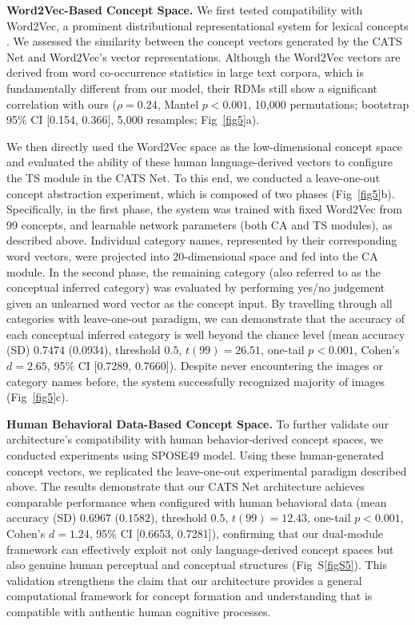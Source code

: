 \documentclass[pdflatex,sn-mathphys-num,lineno]{sn-jnl}%
\begin{document}
\begin{CJK}{UTF8}{gbsn}
\textbf{Word2Vec-Based Concept Space.} We first tested compatibility with Word2Vec, a prominent distributional representational system for lexical concepts \cite{mikolov_distributed_2013,mikolov_advances_2018}. We assessed the similarity between the concept vectors generated by the CATS Net and Word2Vec's vector representations. Although the Word2Vec vectors are derived from word co-occurrence statistics in large text corpora, which is fundamentally different from our model, their RDMs still show a significant correlation with ours ($\rho=0.24$, Mantel $p < 0.001$, 10,000 permutations; bootstrap 95\% CI [0.154, 0.366], 5,000 resamples; Fig~\ref{fig5}a). 

We then directly used the Word2Vec space as the low-dimensional concept space and evaluated the ability of these human language-derived vectors to configure the TS module in the CATS Net. To this end, we conducted a leave-one-out concept abstraction experiment, which is composed of two phases (Fig~\ref{fig5}b). Specifically, in the first phase, the system was trained with fixed Word2Vec from 99 concepts, and learnable network parameters (both CA and TS modules), as described above. Individual category names, represented by their corresponding word vectors, were projected into 20-dimensional space and fed into the CA module. In the second phase, the remaining category (also referred to as the conceptual inferred category) was evaluated by performing yes/no judgement given an unlearned word vector as the concept input. By travelling through all categories with leave-one-out paradigm, we can demonstrate that the accuracy of each conceptual inferred category is well beyond the chance level (mean accuracy (SD) $0.7474$ ($0.0934$), threshold $0.5$, $t(99)=26.51$, one-tail $p < 0.001$, Cohen's $d = 2.65$, 95\% CI [0.7289, 0.7660]). Despite never encountering the images or category names before, the system successfully recognized majority of images (Fig~\ref{fig5}c).

\textbf{Human Behavioral Data-Based Concept Space.} To further validate our architecture's compatibility with human behavior-derived concept spaces, we conducted experiments using SPOSE49 model. Using these human-generated concept vectors, we replicated the leave-one-out experimental paradigm described above. The results demonstrate that our CATS Net architecture achieves comparable performance when configured with human behavioral data (mean accuracy (SD) $0.6967$ ($0.1582$), threshold $0.5$, $t(99)=12.43$, one-tail $p < 0.001$, Cohen's $d = 1.24$, 95\% CI [0.6653, 0.7281]), confirming that our dual-module framework can effectively exploit not only language-derived concept spaces but also genuine human perceptual and conceptual structures (Fig~S\ref{figS5}). This validation strengthens the claim that our architecture provides a general computational framework for concept formation and understanding that is compatible with authentic human cognitive processes.


\end{CJK}
\end{document}
